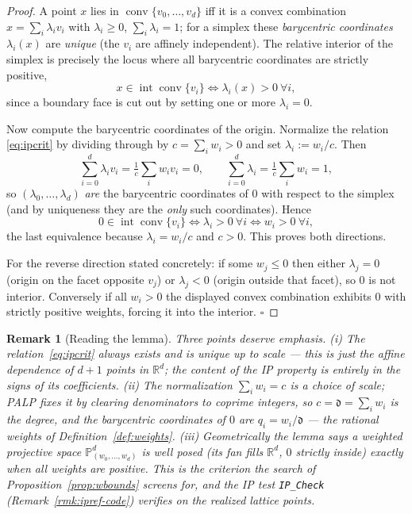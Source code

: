 \documentclass{amsart}
\newtheorem{remark}[theorem]{Remark}
\begin{document}
\begin{proof}
A point $x$ lies in $\operatorname{conv}\{v_0,\dots,v_d\}$ iff it is a convex
combination $x=\sum_i \lambda_i v_i$ with $\lambda_i\ge 0$,
$\sum_i\lambda_i=1$; for a simplex these \emph{barycentric coordinates}
$\lambda_i(x)$ are \emph{unique} (the $v_i$ are affinely independent). The
relative interior of the simplex is precisely the locus where all barycentric
coordinates are strictly positive,
\[
  x\in\operatorname{int}\operatorname{conv}\{v_i\}
  \iff \lambda_i(x)>0 \ \forall i ,
\]
since a boundary face is cut out by setting one or more $\lambda_i=0$.

Now compute the barycentric coordinates of the origin. Normalize the relation
\eqref{eq:ipcrit} by dividing through by $c=\sum_i w_i>0$ and set
$\lambda_i := w_i/c$. Then
\[
  \sum_{i=0}^{d}\lambda_i v_i = \tfrac{1}{c}\sum_i w_i v_i = 0,
  \qquad \sum_{i=0}^{d}\lambda_i = \tfrac{1}{c}\sum_i w_i = 1 ,
\]
so $(\lambda_0,\dots,\lambda_d)$ \emph{are} the barycentric coordinates of
$0$ with respect to the simplex (and by uniqueness they are the \emph{only}
such coordinates). Hence
\[
  0\in\operatorname{int}\operatorname{conv}\{v_i\}
  \iff \lambda_i>0\ \forall i
  \iff w_i>0\ \forall i ,
\]
the last equivalence because $\lambda_i = w_i/c$ and $c>0$. This proves both
directions.

For the reverse direction stated concretely: if some $w_j\le 0$ then either
$\lambda_j=0$ (origin on the facet opposite $v_j$) or $\lambda_j<0$ (origin
outside that facet), so $0$ is not interior. Conversely if all $w_i>0$ the
displayed convex combination exhibits $0$ with strictly positive weights,
forcing it into the interior. $\square$
\end{proof}

\begin{remark}[Reading the lemma]\label{rmk:ipcrit}
Three points deserve emphasis. (i) The relation~\eqref{eq:ipcrit} always
exists and is unique up to scale --- this is just the affine dependence of
$d{+}1$ points in $\mathbb{R}^d$; the \emph{content} of the IP property is
entirely in the \emph{signs} of its coefficients. (ii) The normalization
$\sum_i w_i=c$ is a choice of scale; PALP fixes it by clearing denominators to
coprime integers, so $c=\mathfrak d=\sum_i w_i$ is the \emph{degree}, and the
barycentric coordinates of $0$ are $q_i=w_i/\mathfrak d$ --- the rational
weights of Definition~\ref{def:weights}. (iii) Geometrically the lemma says a
weighted projective space $\mathbb{P}^d_{(w_0,\dots,w_d)}$ is well posed
(its fan fills $\mathbb{R}^d$, $0$ strictly inside) exactly when all weights
are positive. This is the criterion the search of
Proposition~\ref{prop:wbounds} screens for, and the IP test
\texttt{IP\_Check} (Remark~\ref{rmk:ipref-code}) verifies on the realized
lattice points.
\end{remark}
\end{document}
